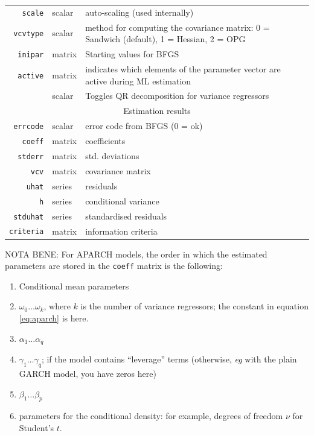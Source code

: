 \documentclass[a4paper,11pt]{article}
\newcommand{\dtk}[1]{\texttt{\detokenize{#1}}}
\begin{document}
\begin{footnotesize}
\begin{tabular}{rlp{}}
  \hline
  \texttt{scale} & scalar & auto-scaling (used internally) \\
  \texttt{vcvtype} & scalar & method for computing the covariance
  matrix: 0 = Sandwich (default), 1 = Hessian, 2 = OPG\\
  \texttt{inipar} & matrix  & Starting values for BFGS \\
  \texttt{active} & matrix  & indicates which elements of the parameter
  vector are active during ML estimation\\
  \dtk{vX_QR} & scalar  & Toggles QR decomposition for variance regressors\\
  \hline
  \multicolumn{3}{c}{Estimation results} \\
  \hline
  \texttt{errcode} & scalar & error code from BFGS (0 = ok)\\
  \texttt{coeff} & matrix & coefficients \\
  \texttt{stderr} & matrix & std. deviations \\
  \texttt{vcv} & matrix & covariance matrix \\
  \texttt{uhat} & series & residuals \\
  \texttt{h} & series & conditional variance \\
  \texttt{stduhat} & series & standardised residuals \\
  \texttt{criteria} & matrix & information criteria\\
  \hline
  \hline
\end{tabular}
\end{footnotesize}

\clearpage

NOTA BENE: For APARCH models, the order in which the estimated
parameters are stored in the \texttt{coeff} matrix is the following:
\begin{enumerate}
\item Conditional mean parameters
\item $\omega_0 \ldots \omega_k$, where $k$ is the number of variance
  regressors; the constant in equation \eqref{eq:aparch} is here.
\item $\alpha_1 \ldots \alpha_q$
\item $\gamma_1 \ldots \gamma_q$; if the model contains ``leverage''
  terms (otherwise, \emph{eg} with the plain GARCH model, you have
  zeros here)
\item $\beta_1 \ldots \beta_p$
\item parameters for the conditional density: for example, degrees of
  freedom $\nu$ for Student's $t$.
\end{enumerate}
\end{document}
